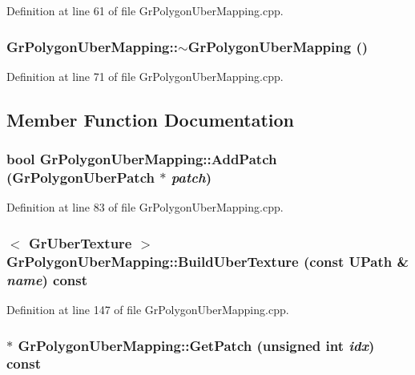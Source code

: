 Definition at line 61 of file GrPolygonUberMapping.cpp.\hypertarget{class_gr_polygon_uber_mapping_730ff767c130a871870c2107982b87c5}{
\subsubsection[{$\sim$GrPolygonUberMapping}]{\setlength{\rightskip}{0pt plus 5cm}GrPolygonUberMapping::$\sim$GrPolygonUberMapping ()}}
\label{class_gr_polygon_uber_mapping_730ff767c130a871870c2107982b87c5}




Definition at line 71 of file GrPolygonUberMapping.cpp.

\subsection{Member Function Documentation}
\hypertarget{class_gr_polygon_uber_mapping_88872a6fb1778fa4e09bff4f4c58d5c6}{
\subsubsection[{AddPatch}]{\setlength{\rightskip}{0pt plus 5cm}bool GrPolygonUberMapping::AddPatch ({\bf GrPolygonUberPatch} $\ast$ {\em patch})}}
\label{class_gr_polygon_uber_mapping_88872a6fb1778fa4e09bff4f4c58d5c6}




Definition at line 83 of file GrPolygonUberMapping.cpp.\hypertarget{class_gr_polygon_uber_mapping_8add114b32b211f1e61ea5aa43b54220}{
\subsubsection[{BuildUberTexture}]{$<$ {\bf GrUberTexture} $>$ GrPolygonUberMapping::BuildUberTexture (const {\bf UPath} \& {\em name}) const}}
\label{class_gr_polygon_uber_mapping_8add114b32b211f1e61ea5aa43b54220}




Definition at line 147 of file GrPolygonUberMapping.cpp.\hypertarget{class_gr_polygon_uber_mapping_9d12426e8c882349e60b9c158f5d62a3}{
\subsubsection[{GetPatch}]{ $\ast$ GrPolygonUberMapping::GetPatch (unsigned int {\em idx}) const}}
\label{class_gr_polygon_uber_mapping_9d12426e8c882349e60b9c158f5d62a3}




